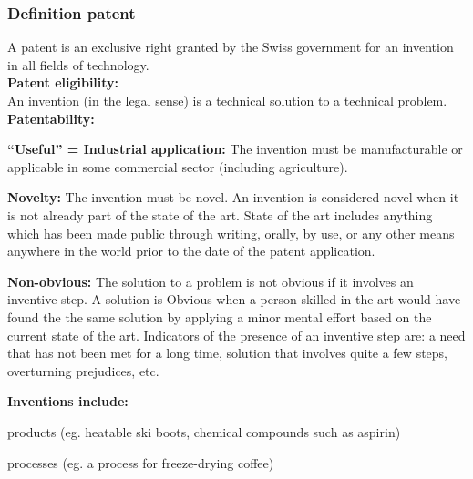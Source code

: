 \subsubsection{Definition patent}
A patent is an exclusive right granted by the Swiss government for an invention in all fields of technology.\\
\textbf{Patent eligibility:}\\
An invention (in the legal sense) is a technical solution to a technical problem.\\
\textbf{Patentability:}
\begin{compactitem}
	\item \textbf{“Useful” = Industrial application:} The invention must be manufacturable or applicable in some commercial
	sector (including agriculture).
	\item \textbf{Novelty:} The invention must be novel. An invention is considered novel when it is not already part of the state of the art. State of the art includes anything which has been made public through writing, orally, by use, or any other means	anywhere in the world prior to the date of the patent application.
	\item \textbf{Non-obvious:} The solution to a problem is not obvious if it involves an inventive step. A solution is Obvious when a person skilled in the art would have found the the same solution by applying a minor mental effort based on the current state of	the art. Indicators of the presence of an inventive step are: a need that has not been
	met for a long time, solution that involves quite a few steps, overturning prejudices, etc.
\end{compactitem}
\textbf{Inventions include:}
\begin{compactitem}
	\item products (eg. heatable ski boots, chemical compounds such as aspirin)
	\item processes (eg. a process for freeze-drying coffee)
\end{compactitem}

